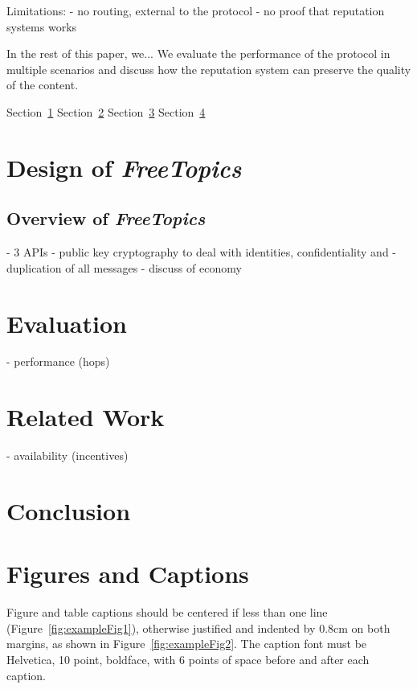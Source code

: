 \documentclass[12pt]{article}
\newcommand{\FC} {\emph{FreeTopics}\xspace}
\begin{document}
Limitations:
    - no routing, external to the protocol
    - no proof that reputation systems works

In the rest of this paper, we...
We evaluate the performance of the protocol in multiple scenarios and discuss
how the reputation system can preserve the quality of the content.

Section~\ref{sec.freechains}
Section~\ref{sec.evaluation}
Section~\ref{sec.related}
Section~\ref{sec.conclusion}

\section{Design of \FC}
\label{sec.freechains}

\subsection{Overview of \FC}

    - 3 APIs
    - public key cryptography to deal with identities, confidentiality and
    - duplication of all messages
    - discuss of economy

\section{Evaluation}
\label{sec.evaluation}
    - performance (hops)

\section{Related Work}
\label{sec.related}
    - availability (incentives)

\section{Conclusion}
\label{sec.conclusion}

\section{Figures and Captions}\label{sec:figs}

Figure and table captions should be centered if less than one line
(Figure~\ref{fig:exampleFig1}), otherwise justified and indented by 0.8cm on
both margins, as shown in Figure~\ref{fig:exampleFig2}. The caption font must
be Helvetica, 10 point, boldface, with 6 points of space before and after each
caption.
\end{document}
